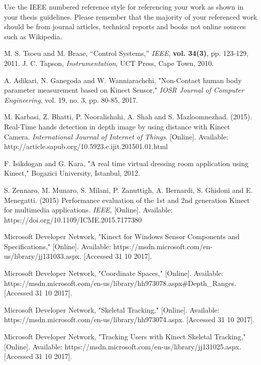 Use the IEEE numbered reference style for referencing your work as shown in your thesis guidelines.
Please remember that the majority of your referenced work should be from journal articles, technical
reports and books not online sources such as Wikipedia.

\begin{thebibliography}{5}
 M. S. Tsoeu and M. Braae, ``Control Systems,'' \emph{IEEE}, {\bf vol. 34(3)}, pp. 123-129, 2011.
 J. C. Tapson, \emph{Instrumentation}, UCT Press, Cape Town, 2010.

 A. Adikari, N. Ganegoda and W. Wanniarachchi, "Non-Contact human body parameter measurement based on Kinect Sensor," \emph{IOSR Journal of Computer Engineering}, vol. 19, no. 3, pp. 80-85, 2017. 

 M. Karbasi, Z. Bhatti, P. Nooralishahi, A. Shah and S. Mazloomnezhad. (2015). Real-Time hands detection in depth image by using distance with Kinect Camera. \emph{International Journal of Internet of Things}. [Online]. Available: http://article.sapub.org/10.5923.c.ijit.201501.01.html

 F. Isikdogan and G. Kara, "A real time virtual dressing room application using Kinect," Bogazici University, Istanbul, 2012.

 S. Zennaro, M. Munaro, S. Milani, P. Zanuttigh, A. Bernardi, S. Ghidoni and E. Menegatti. (2015) Performance evaluation of the 1st and 2nd generation Kinect for multimedia applications. \emph{IEEE}, [Online]. Available: https://doi.org/10.1109/ICME.2015.7177380

 Microsoft Developer Network, "Kinect for Windows Sensor Components and Specifications," [Online]. Available: https://msdn.microsoft.com/en-us/library/jj131033.aspx. [Accessed 31 10 2017].

 Microsoft Developer Network, "Coordinate Spaces," [Online]. Available: https://msdn.microsoft.com/en-us/library/hh973078.aspx#Depth\_Ranges. [Accessed 31 10 2017].

 Microsoft Developer Network, "Skeletal Tracking," [Online]. Available: https://msdn.microsoft.com/en-us/library/hh973074.aspx. [Accessed 31 10 2017].

 Microsoft Developer Network, "Tracking Users with Kinect Skeletal Tracking," [Online]. Available: https://msdn.microsoft.com/en-us/library/jj131025.aspx. [Accessed 31 10 2017].
\end{thebibliography}
